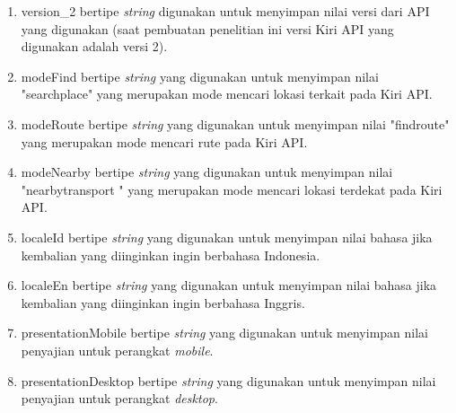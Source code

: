 \begin{enumerate}
	\item version\_2 bertipe \textit{string} digunakan untuk menyimpan nilai versi dari API yang digunakan (saat pembuatan penelitian ini versi Kiri API yang digunakan adalah versi 2).
	\item modeFind bertipe \textit{string} yang digunakan untuk menyimpan nilai "searchplace" yang merupakan mode mencari lokasi terkait pada Kiri API.
	\item modeRoute bertipe \textit{string} yang digunakan untuk menyimpan nilai "findroute" yang merupakan mode mencari rute pada Kiri API.
	\item modeNearby bertipe \textit{string} yang digunakan untuk menyimpan nilai "nearbytransport	" yang merupakan mode mencari lokasi terdekat pada Kiri API.
	
	\item localeId bertipe \textit{string} yang digunakan untuk menyimpan nilai bahasa jika kembalian yang diinginkan ingin berbahasa Indonesia.
	\item localeEn bertipe \textit{string} yang digunakan untuk menyimpan nilai bahasa jika kembalian yang diinginkan ingin berbahasa Inggris.
	\item presentationMobile bertipe \textit{string} yang digunakan untuk menyimpan nilai penyajian untuk perangkat \textit{mobile}.
	\item presentationDesktop bertipe \textit{string} yang digunakan untuk menyimpan nilai penyajian untuk perangkat \textit{desktop}.
\end{enumerate}

